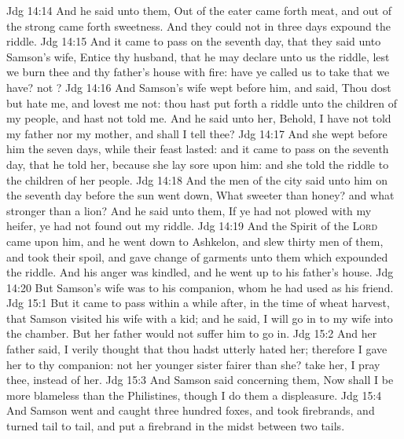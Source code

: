 \vs Jdg 14:14 And he said unto them, Out of the eater came forth meat, and out of the strong came forth sweetness. And they could not in three days expound the riddle.
\vs Jdg 14:15 And it came to pass on the seventh day, that they said unto Samson's wife, Entice thy husband, that he may declare unto us the riddle, lest we burn thee and thy father's house with fire: have ye called us to take that we have?  not ?
\vs Jdg 14:16 And Samson's wife wept before him, and said, Thou dost but hate me, and lovest me not: thou hast put forth a riddle unto the children of my people, and hast not told  me. And he said unto her, Behold, I have not told  my father nor my mother, and shall I tell  thee?
\vs Jdg 14:17 And she wept before him the seven days, while their feast lasted: and it came to pass on the seventh day, that he told her, because she lay sore upon him: and she told the riddle to the children of her people.
\vs Jdg 14:18 And the men of the city said unto him on the seventh day before the sun went down, What  sweeter than honey? and what  stronger than a lion? And he said unto them, If ye had not plowed with my heifer, ye had not found out my riddle.
\vs Jdg 14:19 And the Spirit of the \textsc{Lord} came upon him, and he went down to Ashkelon, and slew thirty men of them, and took their spoil, and gave change of garments unto them which expounded the riddle. And his anger was kindled, and he went up to his father's house.
\vs Jdg 14:20 But Samson's wife was  to his companion, whom he had used as his friend.
\vs Jdg 15:1 But it came to pass within a while after, in the time of wheat harvest, that Samson visited his wife with a kid; and he said, I will go in to my wife into the chamber. But her father would not suffer him to go in.
\vs Jdg 15:2 And her father said, I verily thought that thou hadst utterly hated her; therefore I gave her to thy companion:  not her younger sister fairer than she? take her, I pray thee, instead of her.
\vs Jdg 15:3 And Samson said concerning them, Now shall I be more blameless than the Philistines, though I do them a displeasure.
\vs Jdg 15:4 And Samson went and caught three hundred foxes, and took firebrands, and turned tail to tail, and put a firebrand in the midst between two tails.
